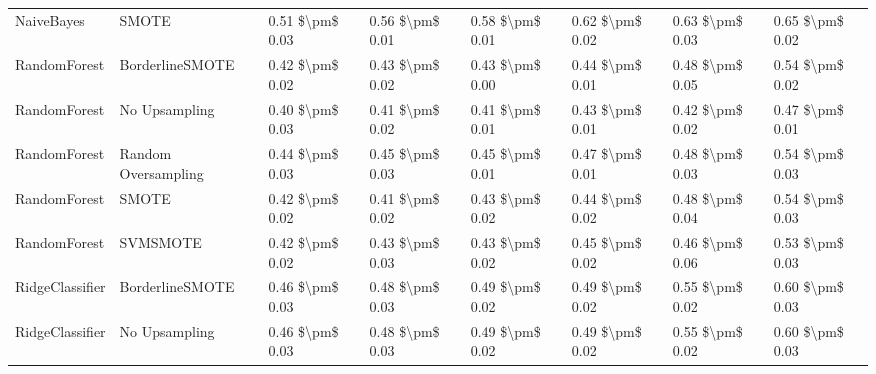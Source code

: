 \begin{tabular}{llllllll}
                     NaiveBayes &                         SMOTE & 0.51 \$\textbackslash pm\$ 0.03 &           0.56 \$\textbackslash pm\$ 0.01 &       0.58 \$\textbackslash pm\$ 0.01 &        0.62 \$\textbackslash pm\$ 0.02 &                         0.63 \$\textbackslash pm\$ 0.03 &     0.65 \$\textbackslash pm\$ 0.02 \\
                   RandomForest &               BorderlineSMOTE & 0.42 \$\textbackslash pm\$ 0.02 &           0.43 \$\textbackslash pm\$ 0.02 &       0.43 \$\textbackslash pm\$ 0.00 &        0.44 \$\textbackslash pm\$ 0.01 &                         0.48 \$\textbackslash pm\$ 0.05 &     0.54 \$\textbackslash pm\$ 0.02 \\
                   RandomForest &                 No Upsampling & 0.40 \$\textbackslash pm\$ 0.03 &           0.41 \$\textbackslash pm\$ 0.02 &       0.41 \$\textbackslash pm\$ 0.01 &        0.43 \$\textbackslash pm\$ 0.01 &                         0.42 \$\textbackslash pm\$ 0.02 &     0.47 \$\textbackslash pm\$ 0.01 \\
                   RandomForest &           Random Oversampling & 0.44 \$\textbackslash pm\$ 0.03 &           0.45 \$\textbackslash pm\$ 0.03 &       0.45 \$\textbackslash pm\$ 0.01 &        0.47 \$\textbackslash pm\$ 0.01 &                         0.48 \$\textbackslash pm\$ 0.03 &     0.54 \$\textbackslash pm\$ 0.03 \\
                   RandomForest &                         SMOTE & 0.42 \$\textbackslash pm\$ 0.02 &           0.41 \$\textbackslash pm\$ 0.02 &       0.43 \$\textbackslash pm\$ 0.02 &        0.44 \$\textbackslash pm\$ 0.02 &                         0.48 \$\textbackslash pm\$ 0.04 &     0.54 \$\textbackslash pm\$ 0.03 \\
                   RandomForest &                      SVMSMOTE & 0.42 \$\textbackslash pm\$ 0.02 &           0.43 \$\textbackslash pm\$ 0.03 &       0.43 \$\textbackslash pm\$ 0.02 &        0.45 \$\textbackslash pm\$ 0.02 &                         0.46 \$\textbackslash pm\$ 0.06 &     0.53 \$\textbackslash pm\$ 0.03 \\
                RidgeClassifier &               BorderlineSMOTE & 0.46 \$\textbackslash pm\$ 0.03 &           0.48 \$\textbackslash pm\$ 0.03 &       0.49 \$\textbackslash pm\$ 0.02 &        0.49 \$\textbackslash pm\$ 0.02 &                         0.55 \$\textbackslash pm\$ 0.02 &     0.60 \$\textbackslash pm\$ 0.03 \\
                RidgeClassifier &                 No Upsampling & 0.46 \$\textbackslash pm\$ 0.03 &           0.48 \$\textbackslash pm\$ 0.03 &       0.49 \$\textbackslash pm\$ 0.02 &        0.49 \$\textbackslash pm\$ 0.02 &                         0.55 \$\textbackslash pm\$ 0.02 &     0.60 \$\textbackslash pm\$ 0.03 \\

\end{tabular}
